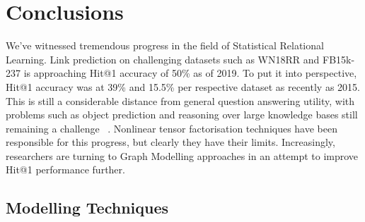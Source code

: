 
\chapter{Conclusions}  %

\ifpdf
    \graphicspath{{Chapter6/Figs/Raster/}{Chapter6/Figs/PDF/}{Chapter6/Figs/}}
\else
    \graphicspath{{Chapter6/Figs/Vector/}{Chapter6/Figs/}}
\fi


We've witnessed tremendous progress in the field of Statistical Relational Learning. Link prediction on challenging datasets such as WN18RR and FB15k-237 is approaching Hit@1 accuracy of 50\% as of 2019. To put it into perspective, Hit@1 accuracy was at 39\% and 15.5\% per respective dataset as recently as 2015. This is still a considerable distance from general question answering utility, with problems such as object prediction and reasoning over large knowledge bases still remaining a challenge ~\citep{hakimov2019evaluating, minervini2019differentiable}. Nonlinear tensor factorisation techniques have been responsible for this progress, but clearly they have their limits. Increasingly, researchers are turning to Graph Modelling approaches in an attempt to improve Hit@1 performance further.  


\section{Modelling Techniques} %

